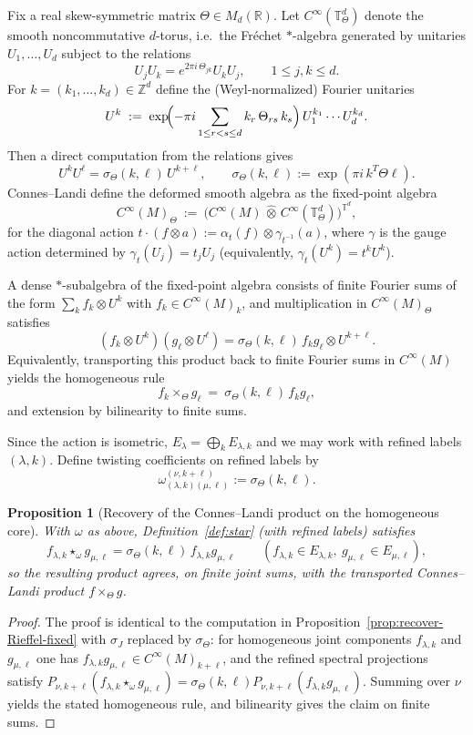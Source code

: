 \documentclass[11pt]{amsart}
\theoremstyle{plain}
\newtheorem{proposition}[theorem]{Proposition}
\theoremstyle{definition}
\theoremstyle{remark}
\newcommand{\bbR}{\mathbb{R}}
\newcommand{\bbZ}{\mathbb{Z}}
\newcommand{\bbT}{\mathbb{T}}
\begin{document}
Fix a real skew-symmetric matrix $\Theta\in M_d(\bbR)$.
Let $C^\infty(\bbT^d_\Theta)$ denote the smooth noncommutative $d$-torus, i.e.\ the Fr\'echet $*$-algebra generated by unitaries
$U_1,\dots,U_d$ subject to the relations
\[
U_jU_k=e^{2\pi i\,\Theta_{jk}}U_kU_j,\qquad 1\le j,k\le d.
\]
For $k=(k_1,\dots,k_d)\in\bbZ^d$ define the (Weyl-normalized) Fourier unitaries
\[
U^k \;:=\; \exp\!\Bigl(-\pi i \sum_{1\le r<s\le d} k_r\,\Theta_{rs}\,k_s\Bigr)\,U_1^{k_1}\cdots U_d^{k_d}.
\]
Then a direct computation from the relations gives
\[
U^kU^\ell=\sigma_\Theta(k,\ell)\,U^{k+\ell},
\qquad 
\sigma_\Theta(k,\ell):=\exp(\pi i\,k^T\Theta\ell).
\]
Connes--Landi \cite{ConnesLandi} define the deformed smooth algebra as the fixed-point algebra
\[
C^\infty(M)_\Theta \ :=\ \bigl(C^\infty(M)\,\widehat\otimes\,C^\infty(\bbT^d_\Theta)\bigr)^{\bbT^d},
\]
for the diagonal action $t\cdot(f\otimes a):=\alpha_t(f)\otimes \gamma_{t^{-1}}(a)$, where $\gamma$ is the gauge action determined by $\gamma_t(U_j)=t_jU_j$ (equivalently, $\gamma_t(U^k)=t^kU^k$).

A dense $*$-subalgebra of the fixed-point algebra consists of finite Fourier sums of the form $\sum_k f_k\otimes U^k$
with $f_k\in C^\infty(M)_k$,
and multiplication in $C^\infty(M)_\Theta$ satisfies
\[
(f_k\otimes U^k)(g_\ell\otimes U^\ell)=\sigma_\Theta(k,\ell)\,f_kg_\ell\otimes U^{k+\ell}.
\]
Equivalently, transporting this product back to finite Fourier sums in $C^\infty(M)$ yields the homogeneous rule
\[
f_k\times_\Theta g_\ell \ =\ \sigma_\Theta(k,\ell)\,f_kg_\ell,
\]
and extension by bilinearity to finite sums.

Since the action is isometric, $E_\lambda=\bigoplus_k E_{\lambda,k}$ and we may work with refined labels $(\lambda,k)$.
Define twisting coefficients on refined labels by
\[
\omega^{(\nu,k+\ell)}_{(\lambda,k)(\mu,\ell)}:=\sigma_\Theta(k,\ell).
\]

\begin{proposition}[Recovery of the Connes--Landi product on the homogeneous core]\label{prop:recover-CL-fixed}
With $\omega$ as above, Definition~\ref{def:star} (with refined labels) satisfies
\[
f_{\lambda,k}\star_\omega g_{\mu,\ell}=\sigma_\Theta(k,\ell)\,f_{\lambda,k}g_{\mu,\ell}
\qquad (f_{\lambda,k}\in E_{\lambda,k},\ g_{\mu,\ell}\in E_{\mu,\ell}),
\]
so the resulting product agrees, on finite joint sums, with the transported Connes--Landi product $f\times_\Theta g$.
\end{proposition}

\begin{proof}
The proof is identical to the computation in Proposition~\ref{prop:recover-Rieffel-fixed} with $\sigma_J$ replaced by $\sigma_\Theta$:
for homogeneous joint components $f_{\lambda,k}$ and $g_{\mu,\ell}$ one has $f_{\lambda,k}g_{\mu,\ell}\in C^\infty(M)_{k+\ell}$,
and the refined spectral projections satisfy
$P_{\nu,k+\ell}(f_{\lambda,k}\star_\omega g_{\mu,\ell})=\sigma_\Theta(k,\ell)P_{\nu,k+\ell}(f_{\lambda,k}g_{\mu,\ell})$.
Summing over $\nu$ yields the stated homogeneous rule, and bilinearity gives the claim on finite sums.
\end{proof}
\end{document}
